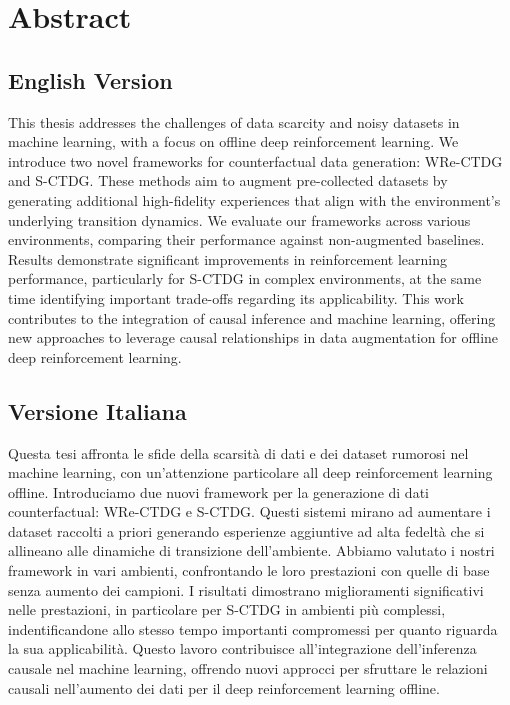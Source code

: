 \chapter*{Abstract}

\section*{English Version}
This thesis addresses the challenges of data scarcity
and noisy datasets in machine learning, with a focus on
offline deep reinforcement learning. We introduce
two novel frameworks for counterfactual data generation:
WRe-CTDG and S-CTDG.
These methods aim to augment pre-collected datasets by generating
additional high-fidelity experiences that align with the environment's
underlying transition dynamics.
We evaluate our frameworks across various environments,
comparing their performance against non-augmented baselines.
Results demonstrate significant improvements in reinforcement
learning performance, particularly for S-CTDG in complex environments,
at the same time identifying important trade-offs regarding its applicability.
This work contributes to the integration of causal inference and
machine learning, offering new approaches to leverage causal relationships
in data augmentation for offline deep reinforcement learning.

\section*{Versione Italiana}

Questa tesi affronta le sfide della scarsità di dati
e dei dataset rumorosi nel machine learning,
con un'attenzione particolare all deep reinforcement learning offline.
Introduciamo
due nuovi framework per la generazione di dati counterfactual:
WRe-CTDG e S-CTDG.
Questi sistemi mirano ad aumentare i dataset raccolti a priori generando
esperienze aggiuntive ad alta fedeltà che si allineano alle dinamiche
di transizione dell'ambiente.
Abbiamo valutato i nostri framework in vari ambienti,
confrontando le loro prestazioni con quelle di base senza aumento dei campioni.
I risultati dimostrano miglioramenti significativi nelle prestazioni,
in particolare per S-CTDG in ambienti più complessi, indentificandone
allo stesso tempo importanti compromessi per quanto riguarda la sua applicabilità.
Questo lavoro contribuisce all'integrazione dell'inferenza
causale nel machine learning, offrendo nuovi approcci per sfruttare
le relazioni causali
nell'aumento dei dati per il deep reinforcement learning offline.